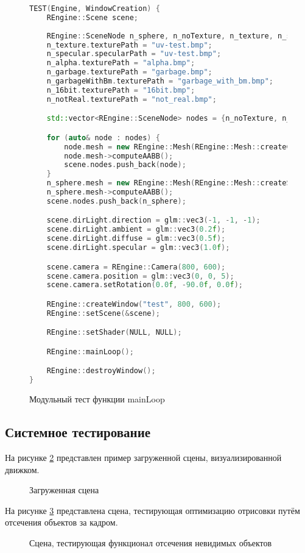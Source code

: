 \begin{figure}[ht]
\begin{lstlisting}[language=C++]
TEST(Engine, WindowCreation) {
    REngine::Scene scene;
    
    REngine::SceneNode n_sphere, n_noTexture, n_texture, n_specular, n_alpha, n_garbage, n_garbageWithBm, n_16bit, n_notReal;
    n_texture.texturePath = "uv-test.bmp";
    n_specular.specularPath = "uv-test.bmp";
    n_alpha.texturePath = "alpha.bmp";
    n_garbage.texturePath = "garbage.bmp";
    n_garbageWithBm.texturePath = "garbage_with_bm.bmp";
    n_16bit.texturePath = "16bit.bmp";
    n_notReal.texturePath = "not_real.bmp";

    std::vector<REngine::SceneNode> nodes = {n_noTexture, n_texture, n_specular, n_alpha, n_garbage, n_garbageWithBm, n_16bit, n_notReal};

    for (auto& node : nodes) {
        node.mesh = new REngine::Mesh(REngine::Mesh::createCube());
        node.mesh->computeAABB();
        scene.nodes.push_back(node);
    }
    n_sphere.mesh = new REngine::Mesh(REngine::Mesh::createSphere());
    n_sphere.mesh->computeAABB();
    scene.nodes.push_back(n_sphere);

    scene.dirLight.direction = glm::vec3(-1, -1, -1);
    scene.dirLight.ambient = glm::vec3(0.2f);
    scene.dirLight.diffuse = glm::vec3(0.5f);
    scene.dirLight.specular = glm::vec3(1.0f);

    scene.camera = REngine::Camera(800, 600);
    scene.camera.position = glm::vec3(0, 0, 5);
    scene.camera.setRotation(0.0f, -90.0f, 0.0f);

    REngine::createWindow("test", 800, 600);
    REngine::setScene(&scene);

    REngine::setShader(NULL, NULL);

    REngine::mainLoop();

    REngine::destroyWindow();
}
\end{lstlisting}  
\caption{Модульный тест функции mainLoop}
\label{unitMainLoop:image}
\end{figure}
\clearpage

\subsection{Системное тестирование}

На рисунке \ref{scene:image} представлен пример загруженной сцены, визуализированной движком.
\begin{figure}[H] %
\caption{Загруженная сцена}
\label{scene:image}
\end{figure}

На рисунке \ref{culling:image} представлена сцена, тестирующая оптимизацию отрисовки путём отсечения объектов за кадром.

\begin{figure}[ht]
\caption{Сцена, тестирующая функционал отсечения невидимых объектов}
\label{culling:image}
\end{figure}
